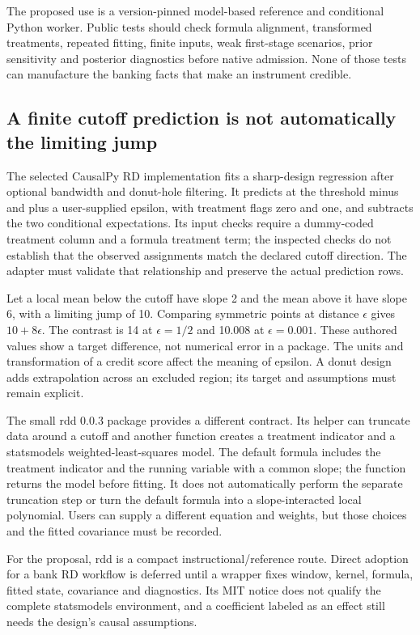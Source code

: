 The proposed use is a version-pinned model-based reference and conditional
Python worker. Public tests should check formula alignment, transformed
treatments, repeated fitting, finite inputs, weak first-stage scenarios,
prior sensitivity and posterior diagnostics before native admission.
None of those tests can manufacture the banking facts that make an
instrument credible.~\citep{exec25_pyrdiv_choice}

\subsection{A finite cutoff prediction is not automatically the limiting jump}
The selected CausalPy RD implementation fits a sharp-design regression
after optional bandwidth and donut-hole filtering. It predicts at the
threshold minus and plus a user-supplied epsilon, with treatment flags zero
and one, and subtracts the two conditional expectations. Its input checks
require a dummy-coded treatment column and a formula treatment term;
the inspected checks do not establish that the observed assignments match
the declared cutoff direction. The adapter must validate that relationship
and preserve the actual prediction rows.~\citep{exec25_pyrdiv_causalpy}

Let a local mean below the cutoff have slope 2 and the mean above it have
slope 6, with a limiting jump of 10. Comparing symmetric points at distance
$\epsilon$ gives $10+8\epsilon$. The contrast is 14 at $\epsilon=1/2$ and
10.008 at $\epsilon=0.001$. These authored values show a target difference,
not numerical error in a package. The units and transformation of a credit
score affect the meaning of epsilon. A donut design adds extrapolation
across an excluded region; its target and assumptions must remain explicit.
\citep{exec25_pyrdiv_choice}

The small rdd 0.0.3 package provides a different contract. Its helper can
truncate data around a cutoff and another function creates a treatment
indicator and a statsmodels weighted-least-squares model. The default
formula includes the treatment indicator and the running variable with a
common slope; the function returns the model before fitting. It does not
automatically perform the separate truncation step or turn the default
formula into a slope-interacted local polynomial. Users can supply a
different equation and weights, but those choices and the fitted covariance
must be recorded.~\citep{exec25_pyrdiv_rdd}

For the proposal, rdd is a compact instructional/reference route. Direct
adoption for a bank RD workflow is deferred until a wrapper fixes window,
kernel, formula, fitted state, covariance and diagnostics. Its MIT notice
does not qualify the complete statsmodels environment, and a coefficient
labeled as an effect still needs the design's causal assumptions.
\citep{exec25_pyrdiv_rdd,exec25_pyrdiv_choice}

